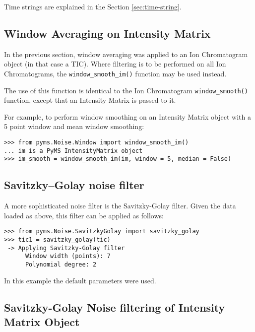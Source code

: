 Time strings are explained in the Section \ref{sec:time-string}.

\subsection{Window Averaging on Intensity Matrix}

In the previous section, window averaging was applied to an 
Ion Chromatogram object (in that case a TIC). Where filtering
is to be performed on all Ion Chromatograms, the {\tt window\_smooth\_im()}
function may be used instead. 

The use of this function is identical to the Ion Chromatogram
{\tt window\_smooth()} function, except that an Intensity Matrix
is passed to it.

For example, to perform window smoothing on an Intensity Matrix 
object with a 5 point window and mean window smoothing:

\begin{verbatim}
>>> from pyms.Noise.Window import window_smooth_im()
... im is a PyMS IntensityMatrix object
>>> im_smooth = window_smooth_im(im, window = 5, median = False)
\end{verbatim}

\subsection{Savitzky--Golay noise filter}


A more sophisticated noise filter is the Savitzky-Golay filter.
Given the data loaded as above, this filter can be applied as
follows:

\begin{verbatim}
>>> from pyms.Noise.SavitzkyGolay import savitzky_golay
>>> tic1 = savitzky_golay(tic)
 -> Applying Savitzky-Golay filter
      Window width (points): 7
      Polynomial degree: 2
\end{verbatim}

In this example the default parameters were used.

\subsection{Savitzky-Golay Noise filtering of Intensity Matrix Object}


